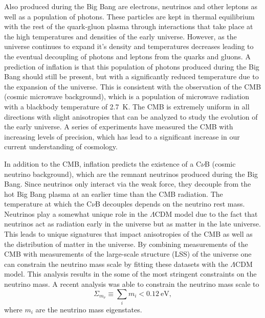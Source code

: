 Also produced during the Big Bang are electrons, neutrinos and other leptons as well as a population of photons. These particles are kept in thermal equilibrium with the rest of the quark-gluon plasma through interactions that take place at the high temperatures and densities of the early universe. However, as the universe continues to expand it's density and temperatures decreases leading to the eventual decoupling of photons and leptons from the quarks and gluons. A prediction of inflation is that this population of photons produced during the Big Bang should still be present, but with a significantly reduced temperature due to the expansion of the universe. This is consistent with the observation of the CMB (cosmic microwave background), which is a population of microwave radiation with a blackbody temperature of 2.7~K. The CMB is extremely uniform in all directions with slight anisotropies that can be analyzed to study the evolution of the early universe. A series of experiments have measured the CMB with increasing levels of precision, which has lead to a significant increase in our current understanding of cosmology.

In addition to the CMB, inflation predicts the existence of a C$\nu$B (cosmic neutrino background), which are the remnant neutrinos produced during the Big Bang. Since neutrinos only interact via the weak force, they decouple from the hot Big Bang plasma at an earlier time than the CMB radiation. The temperature at which the C$\nu$B decouples depends on the neutrino rest mass. Neutrinos play a somewhat unique role in the $\Lambda$CDM model due to the fact that neutrinos act as radiation early in the universe but as matter in the late universe. This leads to unique signatures that impact anisotropies of the CMB as well as the distribution of matter in the universe. By combining measurements of the CMB with measurements of the large-scale structure (LSS) of the universe one can constrain the neutrino mass scale by fitting these datasets with the $\Lambda$CDM model. This analysis results in the some of the most stringent constraints on the neutrino mass. A recent analysis was able to constrain the neutrino mass scale to
\begin{equation}
     \Sigma_{m_\nu} \equiv \sum_{i}m_i<0.12~\mathrm{eV},
\end{equation}
where $m_i$ are the neutrino mass eigenstates. 

